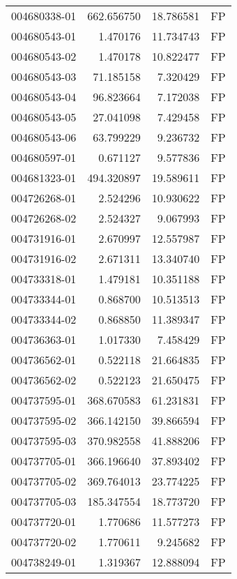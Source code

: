 \begin{tabular}{lrrl}
004680338-01 &  662.656750 &      18.786581 &   FP \\
004680543-01 &    1.470176 &      11.734743 &   FP \\
004680543-02 &    1.470178 &      10.822477 &   FP \\
004680543-03 &   71.185158 &       7.320429 &   FP \\
004680543-04 &   96.823664 &       7.172038 &   FP \\
004680543-05 &   27.041098 &       7.429458 &   FP \\
004680543-06 &   63.799229 &       9.236732 &   FP \\
004680597-01 &    0.671127 &       9.577836 &   FP \\
004681323-01 &  494.320897 &      19.589611 &   FP \\
004726268-01 &    2.524296 &      10.930622 &   FP \\
004726268-02 &    2.524327 &       9.067993 &   FP \\
004731916-01 &    2.670997 &      12.557987 &   FP \\
004731916-02 &    2.671311 &      13.340740 &   FP \\
004733318-01 &    1.479181 &      10.351188 &   FP \\
004733344-01 &    0.868700 &      10.513513 &   FP \\
004733344-02 &    0.868850 &      11.389347 &   FP \\
004736363-01 &    1.017330 &       7.458429 &   FP \\
004736562-01 &    0.522118 &      21.664835 &   FP \\
004736562-02 &    0.522123 &      21.650475 &   FP \\
004737595-01 &  368.670583 &      61.231831 &   FP \\
004737595-02 &  366.142150 &      39.866594 &   FP \\
004737595-03 &  370.982558 &      41.888206 &   FP \\
004737705-01 &  366.196640 &      37.893402 &   FP \\
004737705-02 &  369.764013 &      23.774225 &   FP \\
004737705-03 &  185.347554 &      18.773720 &   FP \\
004737720-01 &    1.770686 &      11.577273 &   FP \\
004737720-02 &    1.770611 &       9.245682 &   FP \\
004738249-01 &    1.319367 &      12.888094 &   FP \\

\end{tabular}
